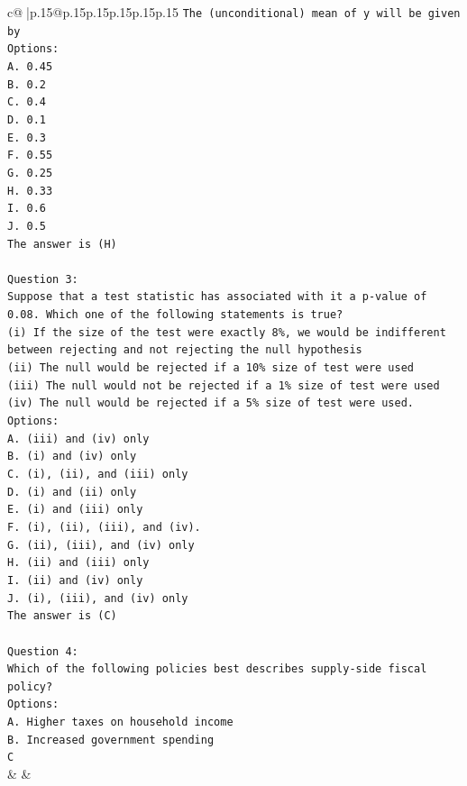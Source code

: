 \documentclass{article}
\begin{document}
{\begin{supertabular}{c@{$\;$}|p{.15\linewidth}@{}p{.15\linewidth}p{.15\linewidth}p{.15\linewidth}p{.15\linewidth}p{.15\linewidth}}
{{{\texttt{The (unconditional) mean of y will be given by} \\
\texttt{Options:} \\
\texttt{A. 0.45} \\
\texttt{B. 0.2} \\
\texttt{C. 0.4} \\
\texttt{D. 0.1} \\
\texttt{E. 0.3} \\
\texttt{F. 0.55} \\
\texttt{G. 0.25} \\
\texttt{H. 0.33} \\
\texttt{I. 0.6} \\
\texttt{J. 0.5} \\
\texttt{The answer is (H)} \\
\\ 
\texttt{Question 3:} \\
\texttt{Suppose that a test statistic has associated with it a p{-}value of 0.08. Which one of the following statements is true?} \\
\texttt{(i) If the size of the test were exactly 8\%, we would be indifferent between rejecting and not rejecting the null hypothesis} \\
\texttt{(ii) The null would be rejected if a 10\% size of test were used} \\
\texttt{(iii) The null would not be rejected if a 1\% size of test were used} \\
\texttt{(iv) The null would be rejected if a 5\% size of test were used.} \\
\texttt{Options:} \\
\texttt{A. (iii) and (iv) only} \\
\texttt{B. (i) and (iv) only} \\
\texttt{C. (i), (ii), and (iii) only} \\
\texttt{D. (i) and (ii) only} \\
\texttt{E. (i) and (iii) only} \\
\texttt{F. (i), (ii), (iii), and (iv).} \\
\texttt{G. (ii), (iii), and (iv) only} \\
\texttt{H. (ii) and (iii) only} \\
\texttt{I. (ii) and (iv) only} \\
\texttt{J. (i), (iii), and (iv) only} \\
\texttt{The answer is (C)} \\
\\ 
\texttt{Question 4:} \\
\texttt{Which of the following policies best describes supply{-}side fiscal policy?} \\
\texttt{Options:} \\
\texttt{A. Higher taxes on household income} \\
\texttt{B. Increased government spending} \\
\texttt{C} \\
            }
        }
    }
    & & \\ \\


\end{supertabular}}
\end{document}
